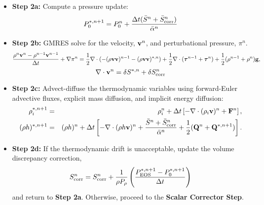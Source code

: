 \documentclass[final]{siamltex}
\def\Fb {{\bf F}}
\def\gb {{\bf g}}
\def\Qb {{\bf Q}}
\def\vb {{\bf v}}
\def\taub   {\boldsymbol{\tau}}
\def\half   {\frac{1}{2}}
\begin{document}
\begin{itemize}
\item {\bf Step 2a:} Compute a pressure update:
\begin{equation}
P_0^{*,n+1} = P_0^n + \frac{\Delta t(\bar{S}^n + \bar{S}_{\rm corr}^n)}{\bar{\alpha}^n}
\end{equation}
\item {\bf Step 2b:} GMRES solve for the velocity, $\vb^n$, and perturbational
pressure, $\pi^n$.
\begin{equation}
\frac{\rho^n\vb^n - \rho^{n-1}\vb^{n-1}}{\Delta t} + \nabla\pi^n = \half\nabla\cdot(-(\rho\vb\vb)^{n-1} - (\rho\vb\vb)^{*,n}) + \frac{1}{2}\nabla\cdot(\taub^{n-1} + \taub^n) + \frac{1}{2}(\rho^{n-1} + \rho^n)\gb,
\end{equation}
\begin{equation}
\nabla\cdot\vb^n = \delta S^{*,n} + \delta S_{\rm corr}^n
\end{equation}
\item {\bf Step 2c:} Advect-diffuse the thermodynamic variables using forward-Euler advective fluxes,
explicit mass diffusion, and implicit energy diffusion:
\begin{eqnarray}
\rho_i^{*,n+1} &=& \rho_i^n + \Delta t\left[-\nabla\cdot(\rho_i\vb)^n + \Fb^n\right], \\
(\rho h)^{*,n+1} &=& (\rho h)^n + \Delta t\left[-\nabla\cdot(\rho h\vb)^n + \frac{\bar{S}^n + \bar{S}_{\rm corr}^n}{\bar{\alpha}^n} + \frac{1}{2}(\Qb^n + \Qb^{*,n+1})\right].\nonumber\\
\end{eqnarray}
\item {\bf Step 2d:} If the thermodynamic drift is unacceptable, update the volume 
discrepancy correction,
\begin{equation}
S_{\rm corr}^n = S_{\rm corr}^n + \frac{1}{\rho P_\rho}\left(\frac{P_{\rm EOS}^{*,n+1} - P_0^{*,n+1}}{\Delta t}\right)
\end{equation}
and return to {\bf Step 2a}.  Otherwise, proceed to the {\bf Scalar Corrector Step}.\\
\end{itemize}
\end{document}
